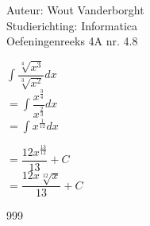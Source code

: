 \documentclass[a4paper]{article}
\newcommand{\Int}{\displaystyle\int}
\begin{document}
  
\noindent \large Auteur: Wout Vanderborght\\
\noindent \large Studierichting: Informatica\\
\noindent \large Oefeningenreeks 4A nr. 4.8\\

\medskip

\normalsize

$\Int \dfrac{\sqrt[4]{x^3}}{\sqrt[3]{x^2}}dx$ \\

$ = \Int \dfrac{x^{\tfrac{3}{4}}}{x^{\tfrac{2}{3}}}dx $ \\

$ = \Int x^{\tfrac{1}{12}}dx $

$ = \dfrac{12x^{\tfrac{13}{12}}}{13} + C $ \\

$ = \dfrac{12  x \sqrt[12]{x}}{13} + C $ \\

\begin{thebibliography}{999}
\end{thebibliography}
\end{document}

